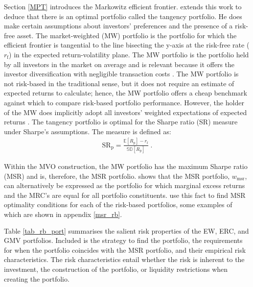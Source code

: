 \documentclass[a4paper,11pt,nocenter,bold,noupper,headcount]{mythesis}
\theoremstyle{plain}
\theoremstyle{definition}
\begin{document}
Section \ref{MPT} introduces the Markowitz efficient frontier. \cite{S64} extends this work to deduce that there is an optimal portfolio called the tangency portfolio. He does make certain assumptions about investors' preferences and the presence of a risk-free asset. The market-weighted (MW) portfolio is the portfolio for which the efficient frontier is tangential to the line bisecting the y-axis at the risk-free rate ($r_\mathrm{f}$) in the expected return-volatility plane. The MW portfolio is the portfolio held by all investors in the market on average and is relevant because it offers the investor diversification with negligible transaction costs \citep{P07}. The MW portfolio is not risk-based in the traditional sense, but it does not require an estimate of expected returns to calculate; hence, the MW portfolio offers a cheap benchmark against which to compare risk-based portfolio performance. However, the holder of the MW does implicitly adopt all investors' weighted expectations of expected returns \citep{H91}. The tangency portfolio is optimal for the  Sharpe ratio (SR) measure under Sharpe's assumptions. The measure is defined as:
\begin{align}
\text{SR}_\mathrm{p} = \frac{\mathbb{E}[R_\mathrm{p}] - r_\mathrm{f}}{\mathbb{SD}[R_\mathrm{p}]} \;.
\end{align}

Within the MVO construction, the MW portfolio has the maximum Sharpe ratio (MSR) and is, therefore, the MSR portfolio. \cite{S07} shows that the MSR portfolio, $w_\mathrm{msr}$, can alternatively be expressed as the portfolio for which marginal excess returns and the MRC's are equal for all portfolio constituents. \cite{J13} use this fact to find MSR optimality conditions for each of the risk-based portfolios, some examples of which are shown in appendix \ref{msr_rb}.

Table \ref{tab_rb_port} summarises the salient risk properties of the EW, ERC, and GMV portfolios. Included is the strategy to find the portfolio, the requirements for when the portfolio coincides with the MSR portfolio, and their empirical risk characteristics. The risk characteristics entail whether the risk is inherent to the investment, the construction of the portfolio, or liquidity restrictions when creating the portfolio.
\end{document}
